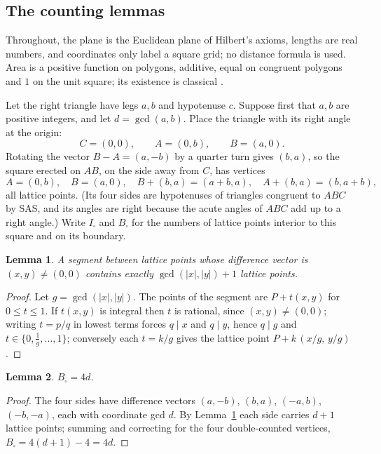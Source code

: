 \documentclass[11pt,a4paper]{article}
\newtheorem{lemma}{Lemma}
\theoremstyle{remark}
\begin{document}
\subsection*{The counting lemmas}

Throughout, the plane is the Euclidean plane of Hilbert's axioms, lengths are
real numbers, and coordinates only label a square grid; no distance formula is
used. Area is a positive function on polygons, additive, equal on congruent
polygons and $1$ on the unit square; its existence is classical
\cite[\S20]{hilbert}.

Let the right triangle have legs $a,b$ and hypotenuse $c$. Suppose first that
$a,b$ are positive integers, and let $d=\gcd(a,b)$. Place the triangle with its
right angle at the origin:
\[
C=(0,0),\qquad A=(0,b),\qquad B=(a,0).
\]
Rotating the vector $B-A=(a,-b)$ by a quarter turn gives $(b,a)$, so the square
erected on $AB$, on the side away from $C$, has vertices
\[
A=(0,b),\quad B=(a,0),\quad B+(b,a)=(a+b,a),\quad A+(b,a)=(b,a+b),
\]
all lattice points. (Its four sides are hypotenuses of triangles congruent to
$ABC$ by SAS, and its angles are right because the acute angles of $ABC$ add up
to a right angle.) Write $I_{\square}$ and $B_{\square}$ for the numbers of
lattice points interior to this square and on its boundary.

\begin{lemma}\label{lem:segment}
A segment between lattice points whose difference vector is $(x,y)\ne(0,0)$
contains exactly $\gcd(|x|,|y|)+1$ lattice points.
\end{lemma}

\begin{proof}
Let $g=\gcd(|x|,|y|)$. The points of the segment are $P+t(x,y)$ for
$0\le t\le 1$. If $t(x,y)$ is integral then $t$ is rational, since
$(x,y)\ne(0,0)$; writing $t=p/q$ in lowest terms forces $q\mid x$ and $q\mid y$,
hence $q\mid g$ and $t\in\{0,\tfrac1g,\dots,1\}$; conversely each $t=k/g$ gives
the lattice point $P+k\,(x/g,\,y/g)$.
\end{proof}

\begin{lemma}\label{lem:boundary}
$B_{\square}=4d$.
\end{lemma}

\begin{proof}
The four sides have difference vectors $(a,-b)$, $(b,a)$, $(-a,b)$, $(-b,-a)$,
each with coordinate gcd $d$. By Lemma~\ref{lem:segment} each side carries
$d+1$ lattice points; summing and correcting for the four double-counted
vertices, $B_{\square}=4(d+1)-4=4d$.
\end{proof}
\end{document}

